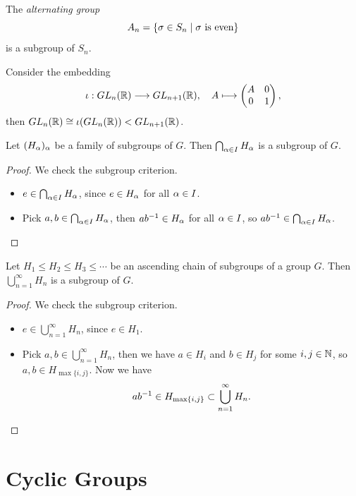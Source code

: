 \begin{example}
  The \emph{alternating group} \[
    A_n = \{\sigma\in S_n \mid \sigma\text{ is even}\}
  \] is a subgroup of \(S_n\).
\end{example}

\begin{proposition}
  Consider the embedding \[
    \iota:GL_n(\mathbb{R})\longrightarrow GL_{n+1}(\mathbb{R}),
    \quad A\longmapsto \begin{pmatrix}
      A & 0 \\
      0 & 1
    \end{pmatrix},
  \] then \(GL_n(\mathbb{R})\cong \iota(GL_n(\mathbb{R})) < GL_{n+1}(\mathbb{R})\). 
\end{proposition}

\begin{proposition}
  Let \((H_\alpha)_\alpha\) be a family of subgroups of \(G\). Then \(\bigcap_{\alpha\in I}H_\alpha\) is a subgroup of \(G\).
\end{proposition}
\begin{proof}
  We check the subgroup criterion.
  \begin{itemize}
    \item \(e\in\bigcap_{\alpha\in I}H_\alpha\), since \(e\in H_\alpha\) for all \(\alpha\in I\).
    \item Pick \(a,b\in\bigcap_{\alpha\in I}H_\alpha\), then \(ab^{-1}\in H_\alpha\) for all \(\alpha\in I\), so \(ab^{-1}\in\bigcap_{\alpha\in I}H_\alpha\).\qedhere
  \end{itemize}
\end{proof}

\begin{proposition}
  Let \(H_1\leq H_2\leq H_3\leq\cdots\) be an ascending chain of subgroups of a group \(G\). Then \(\bigcup_{n=1}^\infty H_n\) is a subgroup of \(G\). 
\end{proposition}
\begin{proof}
  We check the subgroup criterion.
  \begin{itemize}
    \item \(e\in\bigcup_{n=1}^\infty H_n\), since \(e\in H_1\).
    \item Pick \(a,b\in\bigcup_{n=1}^\infty H_n\), then we have \(a\in H_i\) and \(b\in H_j\) for some \(i,j\in\mathbb{N}\), so \(a,b\in H_{\max\{i,j\}}\).
    Now we have \[
      ab^{-1}\in H_{\max\{i,j\}}\subset \bigcup_{n=1}^\infty H_n. \qedhere
    \]
  \end{itemize}
\end{proof}


\section{Cyclic Groups}

